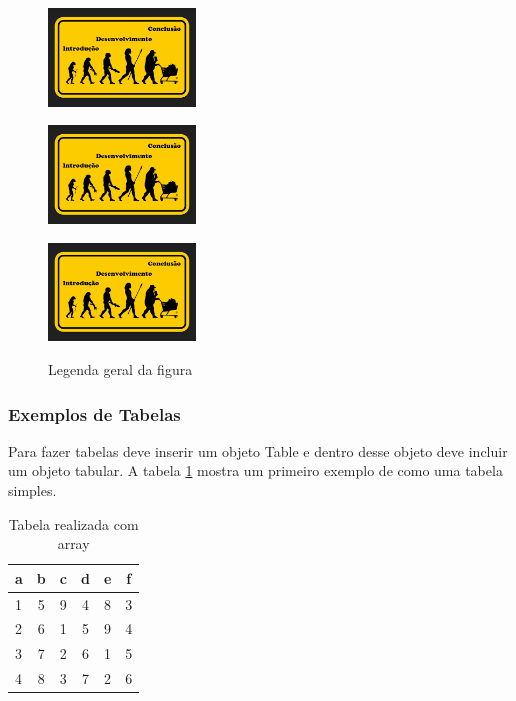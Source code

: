 \begin{figure}[htbp]
\centering
\begin{minipage}{0.35\textwidth}
  \centering
\includegraphics[width=0.35\textwidth]{images/figura1.png}
\label{fig2a}
\end{minipage}%
\begin{minipage}{0.35\textwidth}
  \centering
\includegraphics[width=0.35\textwidth]{images/figura1.png}
\label{fig2b}
\end{minipage}%
\begin{minipage}{0.35\textwidth}
  \centering
\includegraphics[width=0.35\textwidth]{images/figura1.png}
\label{fig2c}
\end{minipage}

\caption{Legenda geral da figura} \label{fig2}
\end{figure}

\subsubsection{Exemplos de Tabelas}

Para fazer tabelas deve inserir um objeto Table e dentro desse objeto deve incluir um objeto tabular. A tabela \ref{tab1} mostra um primeiro exemplo de como uma tabela simples.

\begin{table}[h]
  \centering
    \begin{tabular}{|l|c|c|c|c|c|}\hline
    a & b & c & d & e & f \\\hline 
    1 & 5 & 9 & 4 & 8 & 3 \\\hline 
    2 & 6 & 1 & 5 & 9 & 4 \\\hline 
    3 & 7 & 2 & 6 & 1 & 5 \\\hline 
    4 & 8 & 3 & 7 & 2 & 6 \\\hline
    \end{tabular}
    \caption{Tabela realizada com array}\label{tab1}
\end{table}

